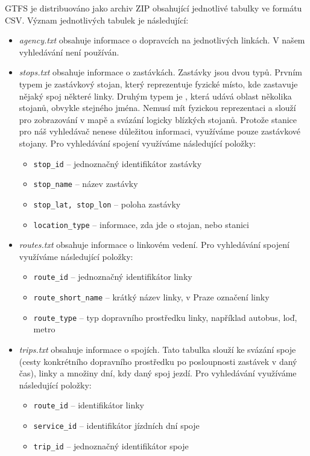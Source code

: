 GTFS je distribuováno jako archiv ZIP obsahující jednotlivé tabulky ve formátu
CSV. Význam jednotlivých tabulek je následující:
\begin{itemize}
\item {\em agency.txt} obsahuje informace o dopravcích na jednotlivých linkách.
V našem vyhledávání není používán.
\item {\em stops.txt} obsahuje informace o zastávkách. Zastávky jsou dvou typů.
Prvním typem je zastávkový stojan, který reprezentuje fyzické místo, kde
zastavuje nějaký spoj některé linky. Druhým typem je , která udává
oblast několika stojanů, obvykle stejného jména. Nemusí mít fyzickou
reprezentaci a slouží pro zobrazování v mapě a svázání logicky blízkých stojanů.
Protože stanice pro náš vyhledávač nenese důležitou informaci, využíváme pouze
zastávkové stojany. Pro vyhledávání spojení využíváme
následující položky:
\begin{itemize}
	\item {\tt stop\_id} -- jednoznačný identifikátor zastávky
	\item {\tt stop\_name} -- název zastávky
	\item {\tt stop\_lat, stop\_lon} -- poloha zastávky
	\item {\tt location\_type} -- informace, zda jde o stojan, nebo stanici
\end{itemize}
\item {\em routes.txt} obsahuje informace o linkovém vedení. Pro vyhledávání
spojení využíváme následující položky:
\begin{itemize}
	\item {\tt route\_id} -- jednoznačný identifikátor linky
	\item {\tt route\_short\_name} -- krátký název linky, v Praze označení linky
	\item {\tt route\_type} -- typ dopravního prostředku linky, například autobus, loď, metro
\end{itemize}
\item {\em trips.txt} obsahuje informace o spojích. Tato tabulka slouží ke
svázání spoje (cesty konkrétního dopravního prostředku po posloupnosti zastávek
v daný čas), linky a množiny dní, kdy daný spoj jezdí. Pro vyhledávání využíváme
následující položky:
\begin{itemize}
	\item {\tt route\_id} -- identifikátor linky
	\item {\tt service\_id} -- identifikátor jízdních dní spoje
	\item {\tt trip\_id} -- jednoznačný identifikátor spoje

\end{itemize}
\end{itemize}
